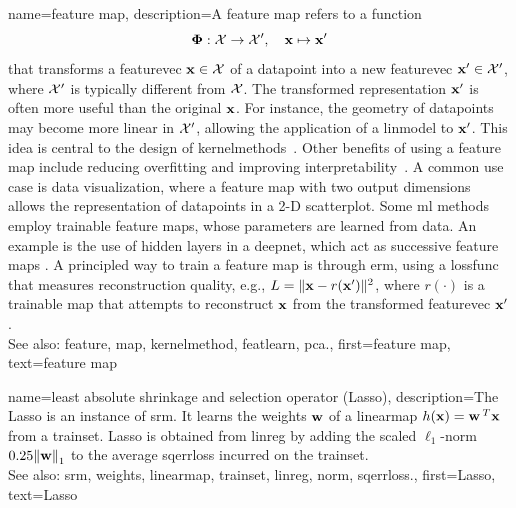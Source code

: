 {name={feature map}, 
	description={A \gls{feature} \gls{map} refers to a \gls{function} 
		$$
		{\bf \Phi}: \mathcal{X} \rightarrow \mathcal{X}', \quad {\bf x} \mapsto {\bf x}'
		$$
		that transforms a \gls{featurevec} ${\bf x} \in \mathcal{X}$ of 
 		a \gls{datapoint} into a new \gls{featurevec} ${\bf x}' \in \mathcal{X}'$, 
 		where $\mathcal{X}'$ is typically different from $\mathcal{X}$.
 		The transformed representation ${\bf x}'$ is often more useful than the original 
 		${\bf x}$. For instance, the geometry of \glspl{datapoint} may become more linear 
 		in $\mathcal{X}'$, allowing the application of a \gls{linmodel} to ${\bf x}'$. 
 		This idea is central to the design of \glspl{kernelmethod}~\cite{LearningKernelsBook}.
 		Other benefits of using a \gls{feature} \gls{map} include reducing \gls{overfitting} and 
 		improving \gls{interpretability}~\cite{Ribeiro2016}. A common use case is \gls{data} 
 		visualization, where a \gls{feature} \gls{map} with two output dimensions allows the representation 
 		of \glspl{datapoint} in a 2-D \gls{scatterplot}. Some \gls{ml} methods employ trainable 
 		\gls{feature} \glspl{map}, whose \glspl{parameter} are learned from \gls{data}. An example is 
 		the use of hidden \glspl{layer} in a \gls{deepnet}, which act as successive \gls{feature} \glspl{map} 
 		\cite{MallatUnderstandingDeepLearning}. A principled way to train a \gls{feature} \gls{map} 
 		is through \gls{erm}, using a \gls{lossfunc} that measures reconstruction quality, 
 		e.g., $L = \|{\bf x} - r({\bf x}')\|^2$, where $r(\cdot)$ is a trainable
 		\gls{map} that attempts to reconstruct ${\bf x}$ from the transformed \gls{featurevec} ${\bf x}'$.
				\\
		See also: \gls{feature}, \gls{map}, \gls{kernelmethod}, \gls{featlearn}, \gls{pca}.},
	first={feature map},
	text={feature map} 
}
	
 
 {name={least absolute shrinkage and selection operator (Lasso)}, 
	description={The Lasso is an 
		instance of \gls{srm}. It learns the \gls{weights} ${\bf w}$ of a \gls{linearmap} 
		$h({\bf x}) = {\bf w}\,^{T} {\bf x}$ from a \gls{trainset}. 
		Lasso is obtained from \gls{linreg} by adding the scaled $\ell_{1}$-\gls{norm} 
		$\regparam \normgeneric{\weights}{1}$ to the average \gls{sqerrloss} incurred on the \gls{trainset}. 
				\\
		See also: \gls{srm}, \gls{weights}, \gls{linearmap}, \gls{trainset}, \gls{linreg}, \gls{norm}, \gls{sqerrloss}.},
	first={Lasso},
	text={Lasso} 
}
 
